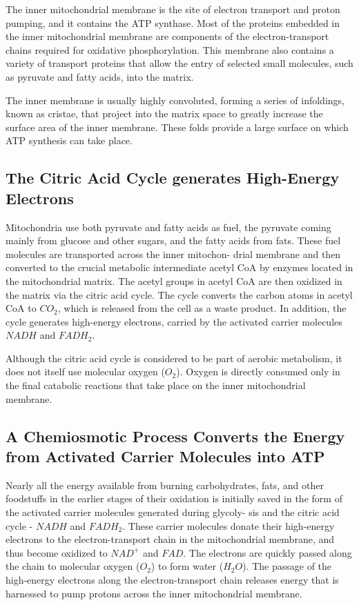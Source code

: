 The inner mitochondrial membrane is the site of electron transport and
proton pumping, and it contains the ATP synthase. Most of the proteins
embedded in the inner mitochondrial membrane are components of the
electron-transport chains required for oxidative phosphorylation. This
membrane also contains a variety of transport proteins that allow the
entry of selected small molecules, such as pyruvate and fatty acids, into
the matrix.

The inner membrane is usually highly convoluted, forming a series of
infoldings, known as cristae, that project into the matrix space to greatly
increase the surface area of the inner membrane. These
folds provide a large surface on which ATP synthesis can take place.

\subsection{The Citric Acid Cycle generates High-Energy Electrons}

Mitochondria use both pyruvate and fatty acids as fuel, the pyruvate
coming mainly from glucose and other sugars, and the fatty acids from
fats. These fuel molecules are transported across the inner mitochon-
drial membrane and then converted to the crucial metabolic intermediate
acetyl CoA by enzymes located in the mitochondrial matrix.
The acetyl groups in acetyl CoA are then oxidized in the matrix
via the citric acid cycle. The cycle converts
the carbon atoms in acetyl CoA to $CO_2$, which is released from the cell as
a waste product. In addition, the cycle generates high-energy electrons,
carried by the activated carrier molecules $NADH$ and $FADH_2$.

Although the citric acid cycle is considered to be part of aerobic metabolism,
it does not itself use molecular oxygen ($O_2$). Oxygen is directly
consumed only in the final catabolic reactions that take place on the
inner mitochondrial membrane.

\subsection{A Chemiosmotic Process Converts the Energy from Activated Carrier Molecules into ATP}

Nearly all the energy available from burning carbohydrates, fats, and
other foodstuffs in the earlier stages of their oxidation is initially saved
in the form of the activated carrier molecules generated during glycoly-
sis and the citric acid cycle - $NADH$ and $FADH_2$. These carrier molecules
donate their high-energy electrons to the electron-transport chain in
the mitochondrial membrane, and thus become oxidized to $NAD^+$ and
$FAD$. The electrons are quickly passed along the chain to molecular oxygen
($O_2$) to form water ($H_{2}O$). The passage of the high-energy electrons
along the electron-transport chain releases energy that is harnessed to
pump protons across the inner mitochondrial membrane.

